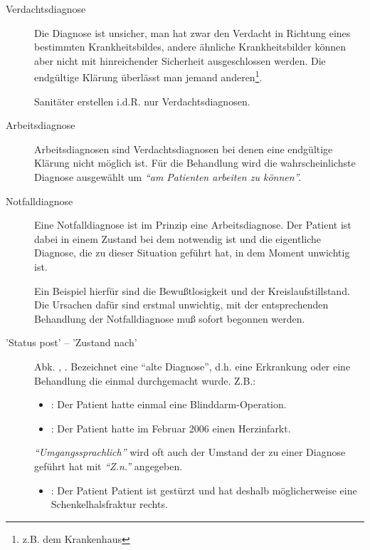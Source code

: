 \begin{description}
    \item[Verdachtsdiagnose]  Die
    Diagnose ist unsicher, man hat zwar den Verdacht in Richtung eines bestimmten Krankheitsbildes, andere ähnliche
    Krankheitsbilder können aber nicht mit hinreichender Sicherheit
    ausgeschlossen werden. Die endgültige Klärung überlässt man jemand
    anderen\footnote{z.B. dem Krankenhaus}. \par 
    Sanitäter erstellen i.d.R. nur Verdachtsdiagnosen.
     
    \item[Arbeitsdiagnose] 
    Arbeitsdiagnosen sind Verdachtsdiagnosen bei denen eine endgültige Klärung nicht möglich ist. Für die Behandlung wird die
    wahrscheinlichste Diagnose ausgewählt um \emph{``am Patienten arbeiten zu
    können''.}
    \item[Notfalldiagnose]  Eine
    Notfalldiagnose ist im Prinzip eine Arbeitsdiagnose. Der Patient ist dabei in einem Zustand bei dem
     notwendig ist und die eigentliche Diagnose, die zu
    dieser Situation geführt hat, in dem Moment unwichtig ist. \par
    Ein Beispiel hierfür sind die Bewußtlosigkeit und der
    Kreislaufstillstand. Die Ursachen dafür sind erstmal
    unwichtig, mit der entsprechenden Behandlung der
    Notfalldiagnose muß sofort begonnen werden.
    \item['Status post' -- 'Zustand nach']
     Abk. , . Bezeichnet eine ``alte Diagnose'', d.h. eine Erkrankung oder eine Behandlung die einmal durchgemacht wurde. Z.B.:
    \begin{itemize}
        \item {}: Der Patient
        hatte einmal eine Blinddarm-Operation.
        \item {}: Der Patient
        hatte im Februar 2006 einen Herzinfarkt.
    \end{itemize}
    \emph{``Umgangssprachlich''} wird oft auch der Umstand der zu einer
    Diagnose geführt hat mit \emph{``Z.n.''} angegeben. 
    \begin{itemize}
        \item {}: Der
        Patient Patient ist gestürzt und hat deshalb möglicherweise eine
        Schenkelhalsfraktur rechts.
    \end{itemize}
\end{description}
